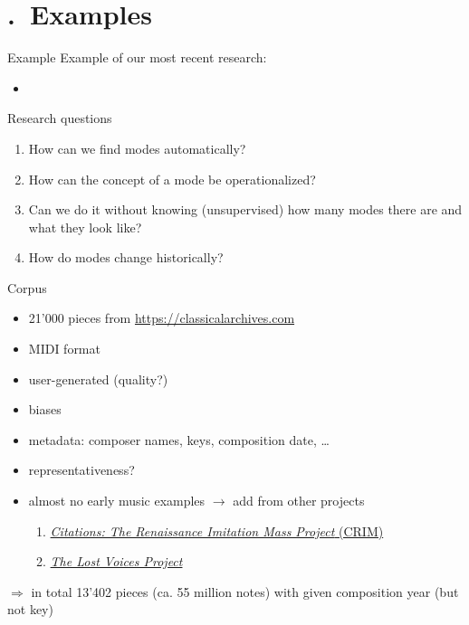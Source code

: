 \section{\thesection.~Examples}

\begin{frame}{Example}
    Example of our most recent research:
    \begin{itemize}
        \item {}
    \end{itemize}
\end{frame}

\begin{frame}{Research questions}
    \begin{enumerate}
        \item How can we find modes \alert{automatically}? 
        \item How can the concept of a \alert{mode} be operationalized? 
        \item Can we do it without knowing (\alert{unsupervised}) how many modes there are and what they look like?
        \item How do modes change \alert{historically}?
    \end{enumerate}
\end{frame}

\begin{frame}{Corpus}
    \begin{itemize}
        \item 21'000 pieces from \url{https://classicalarchives.com}
        \item MIDI format
        \item user-generated (quality?)
        \item biases
        \item metadata: composer names, keys, composition date, \ldots 
        \item representativeness?
        \item almost no early music examples $\longrightarrow$ add from other projects
        \begin{enumerate}
            \item \href{http://crimproject.org/}{\emph{Citations: The Renaissance Imitation Mass Project} (CRIM)}
            \item \href{http://digitalduchemin.org/}{\emph{The Lost Voices Project}}
        \end{enumerate}
    \end{itemize}
    \pause
    $\Longrightarrow$ in total 13'402 pieces (ca. 55 million notes) with given composition year (but not key)
\end{frame}

